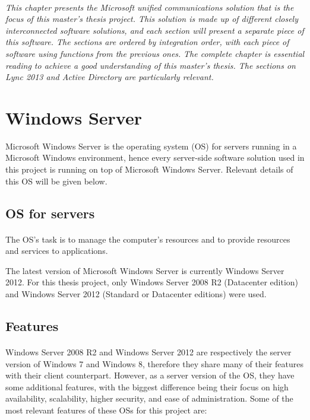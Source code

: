 \paragraph{}
\textit{This chapter presents the Microsoft unified communications solution that is the focus of this master's thesis project. This solution is made up of different closely interconnected software solutions, and each section will present a separate piece of this software. The sections are ordered by integration order, with each piece of software using functions from the previous ones.}
\textit{The complete chapter is essential reading to achieve a good understanding of this master's thesis. The sections on Lync 2013 and Active Directory are particularly relevant.}

\section{Windows Server}
Microsoft Windows Server is the operating system (OS) for servers running in a Microsoft Windows environment, hence every server-side software solution used in this project is running on top of Microsoft Windows Server. Relevant details of this OS will be given below.

\subsection{OS for servers}
\paragraph{}
The OS's task is to manage the computer's resources and to provide resources and services to applications.

The latest version of Microsoft Windows Server is currently Windows Server 2012. For this thesis project, only Windows Server 2008 R2 (Datacenter edition) and Windows Server 2012 (Standard or Datacenter editions) were used.


\subsection{Features}
\paragraph{}
Windows Server 2008 R2 and Windows Server 2012 are respectively the server version of Windows 7 and Windows 8, therefore they share many of their features with their client counterpart. However, as a server version of the OS, they have some additional features, with the biggest difference being their focus on high availability, scalability, higher security, and ease of administration. Some of the most relevant features of these OSs for this project are:

